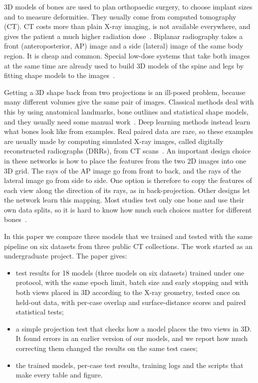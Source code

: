 \documentclass[11pt]{article}
\begin{document}
3D models of bones are used to plan orthopaedic surgery, to choose implant sizes and to measure deformities. They usually come from computed tomography (CT). CT costs more than plain X-ray imaging, is not available everywhere, and gives the patient a much higher radiation dose~\cite{brenner2007}. Biplanar radiography takes a front (anteroposterior, AP) image and a side (lateral) image of the same body region. It is cheap and common. Special low-dose systems that take both images at the same time are already used to build 3D models of the spine and legs by fitting shape models to the images~\cite{dubousset2005,humbert2009,melhem2016}.

Getting a 3D shape back from two projections is an ill-posed problem, because many different volumes give the same pair of images. Classical methods deal with this by using anatomical landmarks, bone outlines and statistical shape models, and they usually need some manual work~\cite{laporte2003,zheng2009,baka2011,karade2015}. Deep learning methods instead learn what bones look like from examples. Real paired data are rare, so these examples are usually made by computing simulated X-ray images, called digitally reconstructed radiographs (DRRs), from CT scans~\cite{ying2019,kasten2020,bayat2020,shakya2023,liuk2025}. An important design choice in these networks is how to place the features from the two 2D images into one 3D grid. The rays of the AP image go from front to back, and the rays of the lateral image go from side to side. One option is therefore to copy the features of each view along the direction of its rays, as in back-projection. Other designs let the network learn this mapping. Most studies test only one bone and use their own data splits, so it is hard to know how much such choices matter for different bones~\cite{shakya2023}.

In this paper we compare three models that we trained and tested with the same pipeline on six datasets from three public CT collections. The work started as an undergraduate project. The paper gives:
\begin{itemize}
\item test results for 18 models (three models on six datasets) trained under one protocol, with the same epoch limit, batch size and early stopping and with both views placed in 3D according to the X-ray geometry, tested once on held-out data, with per-case overlap and surface-distance scores and paired statistical tests;
\item a simple projection test that checks how a model places the two views in 3D. It found errors in an earlier version of our models, and we report how much correcting them changed the results on the same test cases;
\item the trained models, per-case test results, training logs and the scripts that make every table and figure.
\end{itemize}
\end{document}
